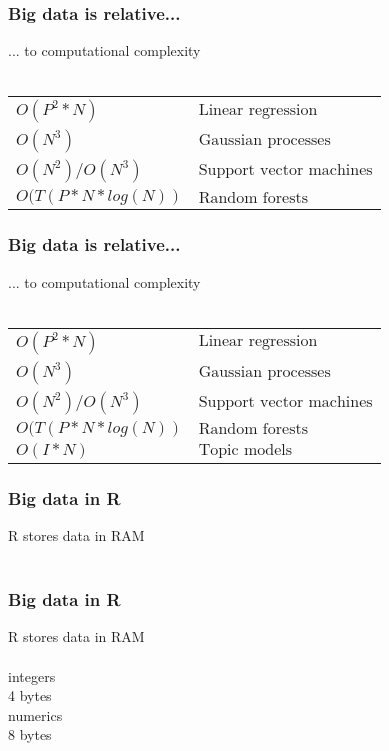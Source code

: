 \documentclass{beamer}
\begin{document}
\begin{frame}
	\frametitle{Big data is relative...}
	\begin{center}
		... to computational complexity\\~\\
		\begin{tabular}{ l l }
			$O(P^2 * N) $ & $ \text{Linear regression}$\\
			$O(N^3) $ & $ \text{Gaussian processes}$\\
			$O(N^2) / O(N^3) $ & $ \text{Support vector machines}$\\
			$O(T(P * N * log(N)) $ & $ \text{Random forests}$\\
		\end{tabular}
	\end{center}
\end{frame}

\begin{frame}
	\frametitle{Big data is relative...}
	\begin{center}
		... to computational complexity\\~\\
		\begin{tabular}{ l l }
			$O(P^2 * N) $ & $ \text{Linear regression}$\\
			$O(N^3) $ & $ \text{Gaussian processes}$\\
			$O(N^2) / O(N^3) $ & $ \text{Support vector machines}$\\
			$O(T(P * N * log(N)) $ & $ \text{Random forests}$\\
			$O(I * N) $ & $ \text{Topic models}$\\
		\end{tabular}
	\end{center}
\end{frame}

\begin{frame}
	\frametitle{Big data in R}
	\begin{center}
		R stores data in RAM\\~\\
	\end{center}
\end{frame}

\begin{frame}
	\frametitle{Big data in R}
	\begin{center}
		R stores data in RAM\\~\\
		integers\\
		4 bytes\\
		numerics\\
		8 bytes\\~\\
	\end{center}
\end{frame}
\end{document}
